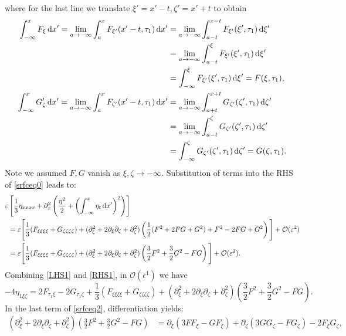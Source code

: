 \documentclass[10pt,reqno,oneside,a4paper]{article}
\begin{document}
where for the last line we translate $\xi' = x'-t, \zeta' = x'+t$ to obtain
\begin{align*}
\int^{x}_{-\infty}F_\xi \,\mathrm{d} x' = \lim_{a\to -\infty} \int^{x}_{a}F_{\xi'}(x'-t, \tau_1) \,\mathrm{d} x' &=  \lim_{a\to -\infty} \int^{x-t}_{a-t}F_{\xi'}(\xi', \tau_1) \,\mathrm{d} \xi' \\
&=  \lim_{a\to -\infty} \int^{\xi}_{a-t}F_{\xi'}(\xi', \tau_1) \,\mathrm{d} \xi' \\
&= \int^{\xi}_{-\infty}F_{\xi'}(\xi', \tau_1) \,\mathrm{d} \xi' = F(\xi, \tau_1), \\
\int^{x}_{-\infty} G_\zeta' \,\mathrm{d} x' = \lim_{a\to -\infty} \int^{x}_{a}F_{\zeta'}(x'-t, \tau_1) \,\mathrm{d} x' &=  \lim_{a\to -\infty} \int^{x+t}_{a+t}G_{\zeta'}(\zeta', \tau_1) \,\mathrm{d} \zeta' \\
&=  \lim_{a\to -\infty} \int^{\zeta}_{a-t}G_{\zeta'}(\zeta', \tau_1) \,\mathrm{d} \zeta' \\
&= \int^{\zeta}_{-\infty}G_{\zeta'}(\zeta', \tau_1) \,\mathrm{d} \zeta' = G(\zeta, \tau_1).
\end{align*}
Note we assumed $F,G$ vanish as $\xi, \zeta \to -\infty.$ Substitution of terms into the RHS of \eqref{srfceq0} leads to:
\begin{align}
\varepsilon &\left[ \frac{1}{3}\eta_{xxxx} +  \partial_x^2 \left( \frac{\eta^2}{2} + \left( \int^{x}_{-\infty} \eta_t \,\mathrm{d} x' \right)^2\right)\right] \nonumber\\
&=\varepsilon \Bigg[ \frac{1}{3}(F_{\xi\xi\xi\xi} + G_{\zeta\zeta\zeta\zeta}) +  (\partial_\xi^2 + 2\partial_\xi \partial_\zeta + \partial_\zeta^2) \left(\frac{1}{2} (F^2 + 2FG +G^2) + F^2 - 2FG + G^2 \right)\Bigg] + \mathcal{O}(\varepsilon^2) \nonumber \\
&= \varepsilon \Bigg[ \frac{1}{3}(F_{\xi\xi\xi\xi} + G_{\zeta\zeta\zeta\zeta}) +  (\partial_\xi^2 + 2\partial_\xi \partial_\zeta + \partial_\zeta^2) \left(\frac{3}{2} F^2  + \frac{3}{2}G^2 - FG \right) \Bigg] + \mathcal{O}(\varepsilon^2). \label{RHS1}
\end{align}
Combining \eqref{LHS1} and \eqref{RHS1}, in $\mathcal{O}(\epsilon^1)$ we have
\begin{equation}\label{srfceq2}
- 4\eta_{1\xi \zeta} = 2F_{\tau_1 \xi} - 2G_{\tau_1 \zeta} + \frac{1}{3}(F_{\xi\xi\xi\xi} + G_{\zeta\zeta\zeta\zeta}) + (\partial_\xi^2 + 2\partial_\xi \partial_\zeta + \partial_\zeta^2) \left(\frac{3}{2} F^2  + \frac{3}{2}G^2 - FG \right).
\end{equation}
In the last term of \eqref{srfceq2}, differentiation yields:
\begin{align*}
(\partial_\xi^2 + 2\partial_\xi \partial_\zeta + \partial_\zeta^2) \left(\frac{3}{2} F^2  + \frac{3}{2}G^2 - FG\right) &= \partial_\xi(3 F F_\xi - G F_\xi) + \partial_\zeta(3 G G_\zeta - F G_\zeta) - 2 F_\xi G_\zeta,
\end{align*}
\end{document}
